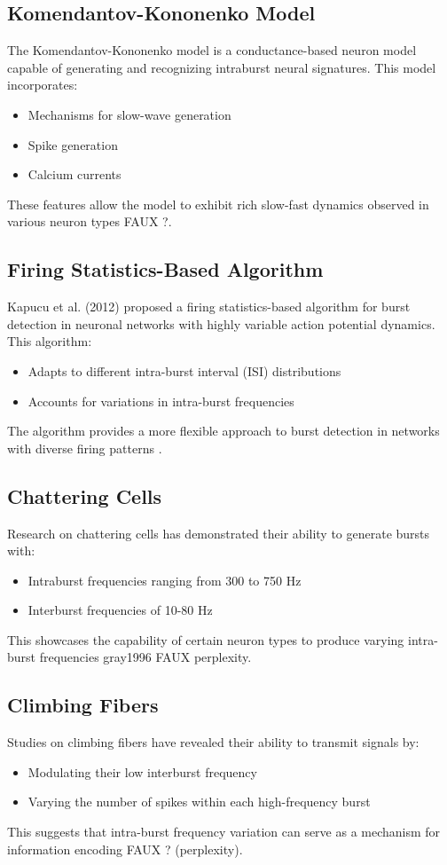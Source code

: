 \documentclass[a4paper,9pt]{extarticle}
\begin{document}
\subsection{Komendantov-Kononenko Model}
The Komendantov-Kononenko model is a conductance-based neuron model capable of generating and recognizing intraburst neural signatures. This model incorporates:
\begin{itemize}
\item Mechanisms for slow-wave generation
\item Spike generation
\item Calcium currents
\end{itemize}
These features allow the model to exhibit rich slow-fast dynamics observed in various neuron types \cite{komendantov1996a} FAUX ?.
\subsection{Firing Statistics-Based Algorithm}
Kapucu et al. (2012) proposed a firing statistics-based algorithm for burst detection in neuronal networks with highly variable action potential dynamics. This algorithm:
\begin{itemize}
\item Adapts to different intra-burst interval (ISI) distributions
\item Accounts for variations in intra-burst frequencies
\end{itemize}
The algorithm provides a more flexible approach to burst detection in networks with diverse firing patterns \cite{kapucu2012a}.
\subsection{Chattering Cells}
Research on chattering cells has demonstrated their ability to generate bursts with:
\begin{itemize}
\item Intraburst frequencies ranging from 300 to 750 Hz
\item Interburst frequencies of 10-80 Hz
\end{itemize}
This showcases the capability of certain neuron types to produce varying intra-burst frequencies {gray1996} FAUX perplexity.
\subsection{Climbing Fibers}
Studies on climbing fibers have revealed their ability to transmit signals by:
\begin{itemize}
\item Modulating their low interburst frequency
\item Varying the number of spikes within each high-frequency burst
\end{itemize}
This suggests that intra-burst frequency variation can serve as a mechanism for information encoding \cite{mathy2009a} FAUX ? (perplexity).
\end{document}
